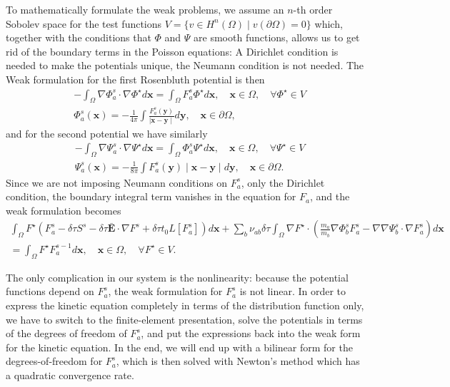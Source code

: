 \documentclass[reprint]{revtex4}
\begin{document}
To mathematically formulate the weak problems, we assume an $n$-th order Sobolev space for the test functions $V=\{v\in H^n(\Omega) \mid v(\partial\Omega)=0 \}$ which, together with the conditions that $\Phi$ and $\Psi$ are smooth functions, allows us to get rid of the boundary terms in the Poisson equations: A Dirichlet condition is needed to make the potentials unique, the Neumann condition is not needed. The Weak formulation for the first Rosenbluth potential is then 
\begin{align}
&-\int_{\Omega}\nabla\Phi_a^s\cdot\nabla\Phi^{\star}d\bm{x}=\int_{\Omega}F_a^s\Phi^{\star}d\bm{x}, \quad \bm{x}\in\Omega, \quad \forall \Phi^{\star}\in V\\
&\Phi_a^s(\bm{x})=-\frac{1}{4\pi}\int \frac{F_a^s(\bm{y})}{\mid \bm{x}-\bm{y}\mid}d\bm{y}, \quad \bm{x}\in\partial\Omega,
\end{align}
and for the second potential we have similarly
\begin{align}
&-\int_{\Omega}\nabla\Psi_a^s\cdot\nabla\Psi^{\star}d\bm{x}=\int_{\Omega}\Phi_a^s\Psi^{\star}d\bm{x}, \quad \bm{x}\in\Omega, \quad \forall \Psi^{\star}\in V\\
&\Psi_a^s(\bm{x})=-\frac{1}{8\pi}\int F_a^s(\bm{y})\mid \bm{x}-\bm{y}\mid d\bm{y}, \quad \bm{x}\in\partial\Omega.
\end{align}
Since we are not imposing Neumann conditions on $F^s_a$, only the Dirichlet condition, the boundary integral term vanishes in the equation for $F_a$, and the weak formulation becomes
\begin{multline}
\int_{\Omega}F^{\star}\left(F_a^s -\delta\tau S^s-\delta\tau\bar{\bm{E}}\cdot\nabla F^s+\delta\tau t_0L[F_a^s]\right)d\bm{x}
+\sum_b\nu_{ab}\delta\tau\int_{\Omega}\nabla F^{\star}\cdot\left(\frac{m_a}{m_b}\nabla \Phi_b^s F_a^s-\nabla\nabla\Psi_b^s\cdot\nabla F_a^s\right)d\bm{x}\\
=\int_{\Omega}F^{\star}F_a^{s-1}d\bm{x}, \quad \bm{x}\in\Omega, \quad \forall F^{\star}\in V.
\end{multline}

The only complication in our system is the nonlinearity: because the potential functions depend on $F^s_a$, the weak formulation for $F^s_a$ is not linear. In order to express the kinetic equation completely in terms of the distribution function only, we have to switch to the finite-element presentation, solve the potentials in terms of the degrees of freedom of $F^s_a$, and put the expressions back into the weak form for the kinetic equation. In the end, we will end up with a bilinear form for the degrees-of-freedom for $F_a^s$, which is then solved with Newton's method which has a quadratic convergence rate.
\end{document}
